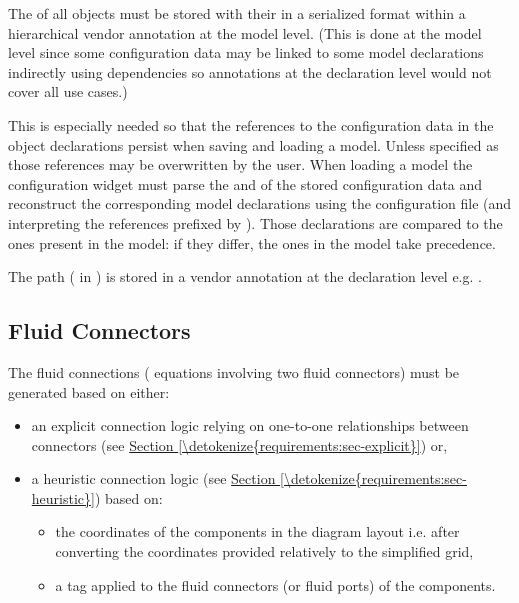 \documentclass[letterpaper,10pt, openany,english]{sphinxmanual}
\begin{document}

The  of all objects must be stored with their  in a serialized format within a hierarchical vendor annotation at the model level. (This is done at the model level since some configuration data may be linked to some model declarations indirectly using dependencies so annotations at the declaration level would not cover all use cases.)

This is especially needed so that the references to the configuration data in the object declarations persist when saving and loading a model. Unless specified as  those references may be overwritten by the user. When loading a model the configuration widget must parse the  and  of the stored configuration data and reconstruct the corresponding model declarations using the configuration file (and interpreting the references prefixed by \sphinxcode{\sphinxupquote{\#}}). Those declarations are compared to the ones present in the model: if they differ, the ones in the model take precedence.


The path ( in {\hyperref[\detokenize{requirements:configuration-api}]{}}) is stored in a vendor annotation at the declaration level e.g. .


\subsection{Fluid Connectors}
\label{\detokenize{requirements:fluid-connectors}}\label{\detokenize{requirements:sec-fluid-connectors}}
The fluid connections ( equations involving two fluid connectors) must be generated based on either:
\begin{itemize}
\item {} 
an explicit connection logic relying on one-to-one relationships between connectors (see \hyperref[\detokenize{requirements:sec-explicit}]{Section \ref{\detokenize{requirements:sec-explicit}}}) or,

\item {} 
a heuristic connection logic (see \hyperref[\detokenize{requirements:sec-heuristic}]{Section \ref{\detokenize{requirements:sec-heuristic}}}) based on:
\begin{itemize}
\item {} 
the coordinates of the components in the diagram layout i.e. after converting the coordinates provided relatively to the simplified grid,

\item {} 
a tag applied to the fluid connectors (or fluid ports) of the components.

\end{itemize}

\end{itemize}
\end{document}
